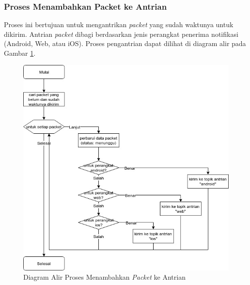 \subsubsection{Proses Menambahkan Packet ke Antrian}
\label{3:proses_menambahkan_packet_ke_antrian}
\par Proses ini bertujuan untuk mengantrikan \textit{packet} yang sudah waktunya untuk dikirim.
Antrian \textit{packet} dibagi berdasarkan jenis perangkat penerima notifikasi (Android, Web, atau iOS). Proses pengantrian dapat dilihat di diagram alir pada Gambar \ref{flowchart_menambahkan_packet_ke_antrian}.
\begin{figure}[hb]
	\caption{Diagram Alir Proses Menambahkan \textit{Packet} ke Antrian} \label{flowchart_menambahkan_packet_ke_antrian}
    \centering\includegraphics[width=1\textwidth]{bab3/figures/flowchart_menambahkan_packet_ke_antrian.jpg}
\end{figure}

